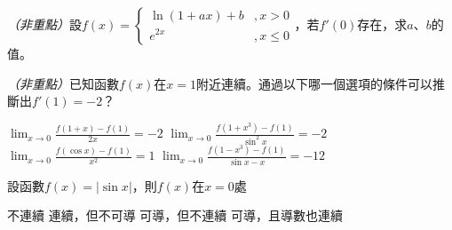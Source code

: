 \documentclass[12pt, addpoints]{exam}
\def \unimportant{\textit{（非重點）}}
\def \arccot{\mathrm{arccot}}
\begin{document}
\begin{questions}

\newpage %

\bonusquestion
\unimportant 設$\displaystyle f(x)=\begin{cases}
    \ln (1+ax) +b &, x>0\\
    e^{2x} &, x \leq 0
\end{cases}$，若$f'(0)$存在，求$a$、$b$的值。

\bonusquestion
\unimportant 已知函數$f(x)$在$x=1$附近連續。通過以下哪一個選項的條件可以推斷出$f'(1)=-2$？
\begin{choices}
    \choice $\displaystyle \lim_{x \to 0} \frac{f(1+x)-f(1)}{2x}=-2$
    \choice $\displaystyle \lim_{x \to 0} \frac{f(1+x^3)-f(1)}{\sin^2 x}=-2$
    \choice $\displaystyle \lim_{x \to 0} \frac{f(\cos x)-f(1)}{x^2}=1$
    \choice $\displaystyle \lim_{x \to 0} \frac{f(1-x^3)-f(1)}{\sin x-x}=-12$
\end{choices}

\question[1]
設函數$f(x)=|\sin x|$，則$f(x)$在$x=0$處
\begin{choices}
    \choice 不連續
    \choice 連續，但不可導
    \choice 可導，但不連續
    \choice 可導，且導數也連續
\end{choices}


\end{questions}
\end{document}
